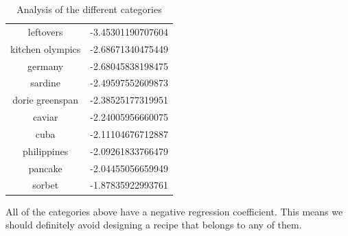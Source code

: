 \begin{table}[h]
    \centering
    \begin{tabular}{c|c}
        leftovers &  -3.45301190707604 \\
        kitchen olympics &  -2.68671340475449 \\
        germany &  -2.68045838198475 \\
        sardine &  -2.49597552609873 \\
        dorie greenspan &  -2.38525177319951 \\
        caviar &  -2.24005956660075 \\
        cuba &  -2.11104676712887 \\
        philippines &  -2.09261833766479 \\
        pancake &  -2.04455056659949 \\
        sorbet &  -1.87835922993761 \\
    \end{tabular}
    \caption{Analysis of the different categories}
    \label{tab:Ingredients}
\end{table}
All of the categories above have a negative regression coefficient. This means we should definitely avoid designing a recipe that belongs to any of them. 
